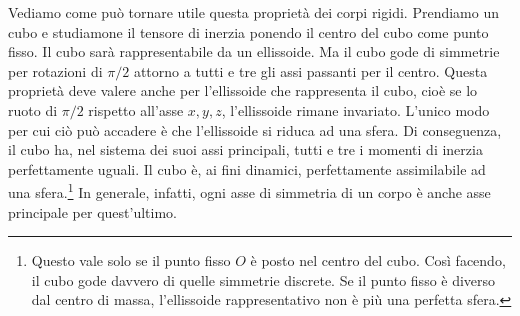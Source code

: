 \documentclass[a4paper,openany]{article}
\begin{document}
	
	
	Vediamo come può tornare utile questa proprietà dei corpi rigidi. Prendiamo un cubo e studiamone il tensore di inerzia ponendo il centro del cubo come punto fisso. Il cubo sarà rappresentabile da un ellissoide. Ma il cubo gode di simmetrie per rotazioni di $\pi/2$ attorno a tutti e tre gli assi passanti per il centro. Questa proprietà deve valere anche per l'ellissoide che rappresenta il cubo, cioè se lo ruoto di $\pi/2$ rispetto all'asse $x,y,z$, l'ellissoide rimane invariato. L'unico modo per cui ciò può accadere è che l'ellissoide si riduca ad una sfera. Di conseguenza, il cubo ha, nel sistema dei suoi assi principali, tutti e tre i momenti di inerzia perfettamente uguali. Il cubo è, ai fini dinamici, perfettamente assimilabile ad una sfera.\footnote{Questo vale solo se il punto fisso $O$ è posto nel centro del cubo. Così facendo, il cubo gode davvero di quelle simmetrie discrete. Se il punto fisso è diverso dal centro di massa, l'ellissoide rappresentativo non è più una perfetta sfera.} In generale, infatti, ogni asse di simmetria di un corpo è anche asse principale per quest'ultimo.
\end{document}
